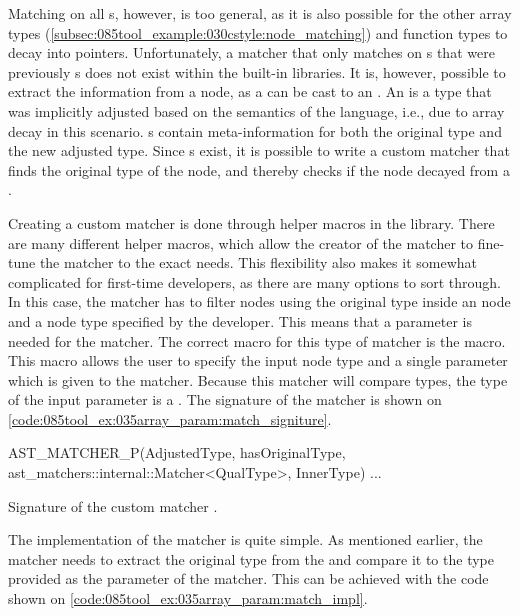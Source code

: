 Matching on all s, however, is too general, as it is also possible for the other array types (\cref{subsec:085tool_example:030cstyle:node_matching}) and function types to decay into pointers.
Unfortunately, a matcher that only matches on s that were previously s does not exist within the built-in libraries. It is, however, possible to extract the information from a node, as a  can be cast to an . An  is a type that was implicitly adjusted based on the semantics of the language, i.e., due to array decay in this scenario. s contain meta-information for both the original type and the new adjusted type. Since s exist, it is possible to write a custom matcher that finds the original type of the node, and thereby checks if the node decayed from a .

Creating a custom matcher is done through helper macros in the library. There are many different helper macros, which allow the creator of the matcher to fine-tune the matcher to the exact needs. This flexibility also makes it somewhat complicated for first-time developers, as there are many options to sort through. In this case, the matcher has to filter nodes using the original type inside an  node and a node type specified by the developer. This means that a parameter is needed for the matcher. The correct macro for this type of matcher is the  macro. This macro allows the user to specify the input node type and a single parameter which is given to the matcher. Because this matcher will compare types, the type of the input parameter is a . The signature of the matcher is shown on \cref{code:085tool_ex:035array_param:match_signiture}.

\begin{listing}[H]
    \begin{cppcode}
AST_MATCHER_P(AdjustedType, hasOriginalType, ast_matchers::internal::Matcher<QualType>, InnerType) {
    ...
}
    \end{cppcode}
    \caption{Signature of the custom matcher .}
    \label{code:085tool_ex:035array_param:match_signiture}
\end{listing}

The implementation of the matcher is quite simple. As mentioned earlier, the matcher needs to extract the original type from the  and compare it to the type provided as the parameter of the matcher. This can be achieved with the code shown on \cref{code:085tool_ex:035array_param:match_impl}.

